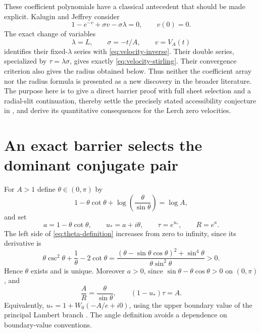 These coefficient polynomials have a classical antecedent that should be
made explicit.  Kalugin and Jeffrey \cite[\S2.1, Theorem~1]{KaluginJeffrey2012}
consider
\[
 1-e^{-v}+\sigma v-\sigma\lambda=0,\qquad v(0)=0.
\]
The exact change of variables
\begin{equation}\label{eq:classical-variable-map}
 \lambda=L,\qquad \sigma=-t/A,\qquad v=V_A(t)
\end{equation}
identifies their fixed-$\lambda$ series with \eqref{eq:velocity-inverse}.
Their double series, specialized by $\tau=\lambda\sigma$, gives exactly
\eqref{eq:velocity-stirling}.  Their convergence criterion also gives the
radius obtained below.  Thus neither the coefficient array nor the
radius formula is presented as a new discovery in the broader literature.
The purpose here is to give a direct barrier proof with full sheet
selection and a radial-slit continuation, thereby settle the precisely
stated accessibility conjecture in \cite{HarmonicBaseline}, and derive
its quantitative consequences for the Lerch zero velocities.

\section{An exact barrier selects the dominant conjugate pair}
\label{sec:dominant-pair}

For $A>1$ define $\theta\in(0,\pi)$ by
\begin{equation}\label{eq:theta-definition}
 1-\theta\cot\theta+
       \log\left(\frac{\theta}{\sin\theta}\right)=\log A,
\end{equation}
and set
\begin{equation}\label{eq:critical-parameters}
 a=1-\theta\cot\theta,\qquad u_*=a+i\theta,\qquad
 \tau=e^{u_*},\qquad R=e^a.
\end{equation}
The left side of \eqref{eq:theta-definition} increases from zero to
infinity, since its derivative is
\[
 \theta\csc^2\theta+\frac1\theta-2\cot\theta
 =\frac{(\theta-\sin\theta\cos\theta)^2+\sin^4\theta}
        {\theta\sin^2\theta}>0.
\]
Hence $\theta$ exists and is unique.  Moreover $a>0$, since
$\sin\theta-\theta\cos\theta>0$ on $(0,\pi)$, and
\begin{equation}\label{eq:critical-relations}
 \frac AR=\frac{\theta}{\sin\theta},\qquad
 (1-u_*)\tau=A.
\end{equation}
Equivalently, $u_*=1+W_0(-A/e+i0)$, using the upper boundary value of
the principal Lambert branch \cite{DLMFLambert}.  The angle definition
avoids a dependence on boundary-value conventions.

